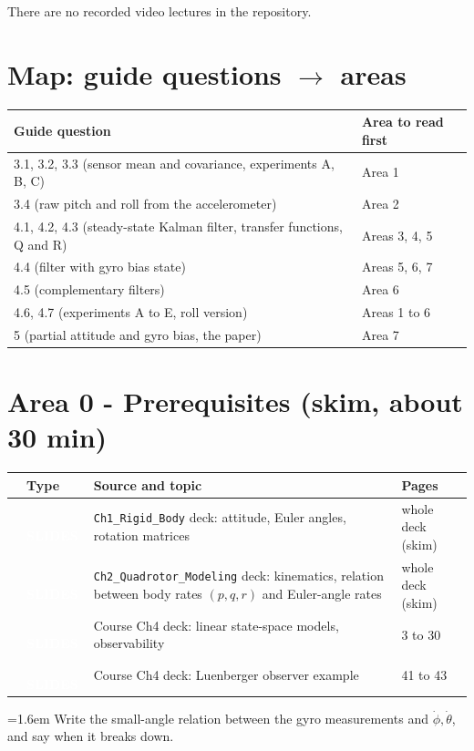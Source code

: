 \documentclass[10pt,a4paper]{article}
\newcommand{\cb}{\raisebox{-0.35ex}{\Large$\square$}}
\newcommand{\srctag}[2]{\colorbox{#1}{\textcolor{white}{\textbf{\scriptsize\,#2\,}}}}
\newcommand{\SLIDES}{\srctag{slides}{SLIDES}}
\newcommand{\chk}[1]{\par\noindent\hangindent=1.6em\hangafter=1 \cb\hspace{0.6em}#1}
\begin{document}
\vspace{0.5ex}
There are no recorded video lectures in the repository.

\section*{Map: guide questions $\rightarrow$ areas}

\begin{tabularx}{\textwidth}{@{}l X@{}}
\toprule
Guide question & Area to read first\\
\midrule
3.1, 3.2, 3.3 (sensor mean and covariance, experiments A, B, C) & Area 1\\
3.4 (raw pitch and roll from the accelerometer) & Area 2\\
4.1, 4.2, 4.3 (steady-state Kalman filter, transfer functions, Q and R) & Areas 3, 4, 5\\
4.4 (filter with gyro bias state) & Areas 5, 6, 7\\
4.5 (complementary filters) & Area 6\\
4.6, 4.7 (experiments A to E, roll version) & Areas 1 to 6\\
5 (partial attitude and gyro bias, the paper) & Area 7\\
\bottomrule
\end{tabularx}

\section*{Area 0 - Prerequisites (skim, about 30 min)}

\begin{tabularx}{\textwidth}{@{}C T X l@{}}
\toprule
\cb & Type & Source and topic & Pages\\
\midrule
\cb & \SLIDES & \texttt{Ch1\_Rigid\_Body} deck: attitude, Euler angles, rotation matrices & whole deck (skim)\\
\cb & \SLIDES & \texttt{Ch2\_Quadrotor\_Modeling} deck: kinematics, relation between body rates $(p,q,r)$ and Euler-angle rates & whole deck (skim)\\
\cb & \SLIDES & Course Ch4 deck: linear state-space models, observability & 3 to 30\\
\cb & \SLIDES & Course Ch4 deck: Luenberger observer example & 41 to 43\\
\bottomrule
\end{tabularx}
\begin{selfcheck}
\chk{Write the small-angle relation between the gyro measurements and $\dot\phi,\dot\theta$, and say when it breaks down.}
\end{selfcheck}
\end{document}
